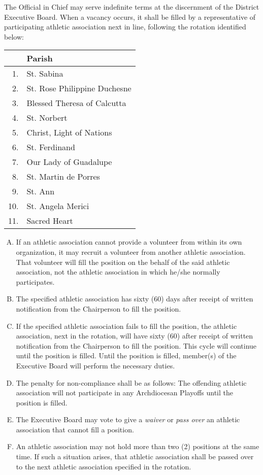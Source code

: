 The Official in Chief may serve indefinite terms at the discernment of the District Executive Board. When a vacancy occurs, it shall be filled by a representative of participating athletic association next in line, following the rotation identified below:

\begin{center}
    \begin{tabular}{ r l }
        & Parish \\
        \hline 
        1. & St. Sabina \\
        2. & St. Rose Philippine Duchesne \\
        3. & Blessed Theresa of Calcutta \\
        4. & St. Norbert \\
        5. & Christ, Light of Nations \\
        6. & St. Ferdinand \\
        7. & Our Lady of Guadalupe \\
        8. & St. Martin de Porres \\
        9. & St. Ann \\
        10. & St. Angela Merici \\
        11. & Sacred Heart \\
        \hline
    \end{tabular}
\end{center}

\begin{enumerate}[A.]
    \item If an athletic association cannot provide a volunteer from within its own organization, it may recruit a volunteer from another athletic association. That volunteer will fill the position on the behalf of the said athletic association, not the athletic association in which he/she normally participates.
    \item The specified athletic association has sixty (60) days after receipt of written notification from the Chairperson to fill the position.
    \item If the specified athletic association fails to fill the position, the athletic association, next in the rotation, will have sixty (60) after receipt of written notification from the Chairperson to fill the position.  This cycle will continue until the position is filled.  Until the position is filled, member(s) of the Executive Board will perform  the necessary duties.
    \item The penalty for non-compliance shall be as follows:  The offending athletic association will not participate in any Archdiocesan Playoffs until the position is filled.
    \item The Executive Board may vote to give a {\em waiver} or {\em pass over} an athletic association that cannot fill a position.
    \item An athletic association may not hold more than two (2) positions at the same time.  If such a situation arises, that athletic association shall be passed over to the next athletic association specified in the rotation.
\end{enumerate}

